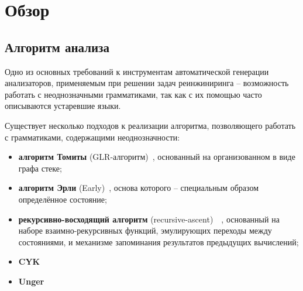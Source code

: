 \section{Обзор}


\subsection{Алгоритм анализа}

Одно из основных требований к инструментам автоматической генерации анализаторов, применяемым при решении задач реинжиниринга -- возможность работать с неоднозначными грамматиками, так как с их помощью часто описываются устаревшие языки.

Существует несколько подходов к реализации алгоритма, позволяющего работать с грамматиками, содержащими неоднозначности:
\begin{itemize}
  \item {\bfseries алгоритм Томиты} (GLR-алгоритм)~\cite{Practical Guide}, основанный на организованном в виде графа стеке;
  \item {\bfseries алгоритм Эрли} (Early)~\cite{Practical Guide}, основа которого -- специальным образом определённое состояние;
  \item {\bfseries рекурсивно-восходящий алгоритм} (recursive-ascent)~\cite{RECURSIVE-ASCENT PARSING}~\cite{RecursiveAscentParsing}, основанный на наборе взаимно-рекурсивных функций, эмулирующих переходы между состояниями, и механизме запоминания результатов предыдущих вычислений;
  \item {\bfseries CYK}~\cite{Practical Guide}
  \item {\bfseries Unger}~\cite{Practical Guide}
\end{itemize}
       

